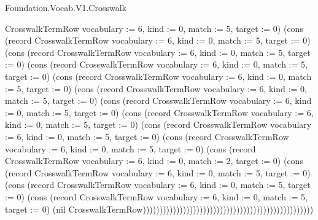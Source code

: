 \begin{lexlean}{Foundation.Vocab.V1.Crosswalk}
\begin{semanticmodule}
{CrosswalkTermRow {vocabulary := 6, kind := 0, match := 5, target := 0}) (cons (record CrosswalkTermRow {vocabulary := 6, kind := 0, match := 5, target := 0}) (cons (record CrosswalkTermRow {vocabulary := 6, kind := 0, match := 5, target := 0}) (cons (record CrosswalkTermRow {vocabulary := 6, kind := 0, match := 5, target := 0}) (cons (record CrosswalkTermRow {vocabulary := 6, kind := 0, match := 5, target := 0}) (cons (record CrosswalkTermRow {vocabulary := 6, kind := 0, match := 5, target := 0}) (cons (record CrosswalkTermRow {vocabulary := 6, kind := 0, match := 5, target := 0}) (cons (record CrosswalkTermRow {vocabulary := 6, kind := 0, match := 5, target := 0}) (cons (record CrosswalkTermRow {vocabulary := 6, kind := 0, match := 5, target := 0}) (cons (record CrosswalkTermRow {vocabulary := 6, kind := 0, match := 5, target := 0}) (cons (record CrosswalkTermRow {vocabulary := 6, kind := 0, match := 2, target := 0}) (cons (record CrosswalkTermRow {vocabulary := 6, kind := 0, match := 5, target := 0}) (cons (record CrosswalkTermRow {vocabulary := 6, kind := 0, match := 5, target := 0}) (cons (record CrosswalkTermRow {vocabulary := 6, kind := 0, match := 5, target := 0}) (nil CrosswalkTermRow)))))))))))))))))))))))))))))))))))))))))))))))))))
}


\end{semanticmodule}
\end{lexlean}
